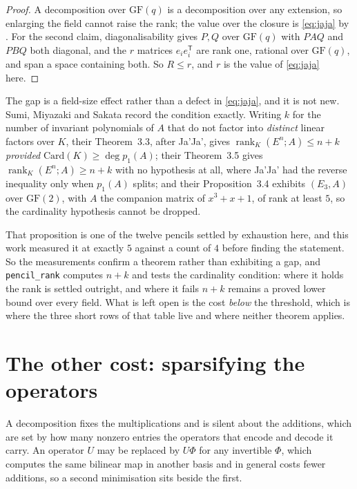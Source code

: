 \documentclass[11pt,reqno]{amsart}
\theoremstyle{plain}
\theoremstyle{definition}
\theoremstyle{remark}
\newcommand{\rk}{\operatorname{rank}}
\begin{document}
\begin{proof}
A decomposition over $\mathrm{GF}(q)$ is a decomposition over any extension, so
enlarging the field cannot raise the rank; the value over the closure is
\eqref{eq:jaja} by \cite{jaja1979}. For the second claim, diagonalisability
gives $P, Q$ over $\mathrm{GF}(q)$ with $P A Q$ and $P B Q$ both diagonal, and
the $r$ matrices $e_i e_i^{\mathsf T}$ are rank one, rational over
$\mathrm{GF}(q)$, and span a space containing both. So $R \le r$, and $r$ is the
value of \eqref{eq:jaja} here.
\end{proof}

The gap is a field-size effect rather than a defect in \eqref{eq:jaja}, and it
is not new. Sumi, Miyazaki and Sakata \cite{sumi2009} record the condition
exactly. Writing $k$ for the number of invariant polynomials of $A$ that do not
factor into \emph{distinct} linear factors over $K$, their Theorem~3.3, after
Ja'Ja', gives $\rk_K(E^n; A) \le n + k$ \emph{provided}
$\mathrm{Card}(K) \ge \deg p_1(A)$; their Theorem~3.5 gives
$\rk_K(E^n; A) \ge n + k$ with no hypothesis at all, where Ja'Ja' had the
reverse inequality only when $p_1(A)$ splits; and their Proposition~3.4 exhibits
$(E_3, A)$ over $\mathrm{GF}(2)$, with $A$ the companion matrix of $x^3 + x + 1$,
of rank at least $5$, so the cardinality hypothesis cannot be dropped.

That proposition is one of the twelve pencils settled by exhaustion here, and
this work measured it at exactly $5$ against a count of $4$ before finding the
statement. So the measurements confirm a theorem rather than exhibiting a gap,
and \texttt{pencil\_rank} computes $n + k$ and tests the cardinality condition:
where it holds the rank is settled outright, and where it fails $n + k$ remains
a proved lower bound over every field. What is left open is the cost \emph{below}
the threshold, which is where the three short rows of that table live and where
neither theorem applies.

\section{The other cost: sparsifying the operators}\label{sec:sparsify}

A decomposition fixes the multiplications and is silent about the additions,
which are set by how many nonzero entries the operators that encode and decode
it carry. An operator $U$ may be replaced by $U\Phi$ for any invertible $\Phi$,
which computes the same bilinear map in another basis and in general costs fewer
additions, so a second minimisation sits beside the first.
\end{document}
